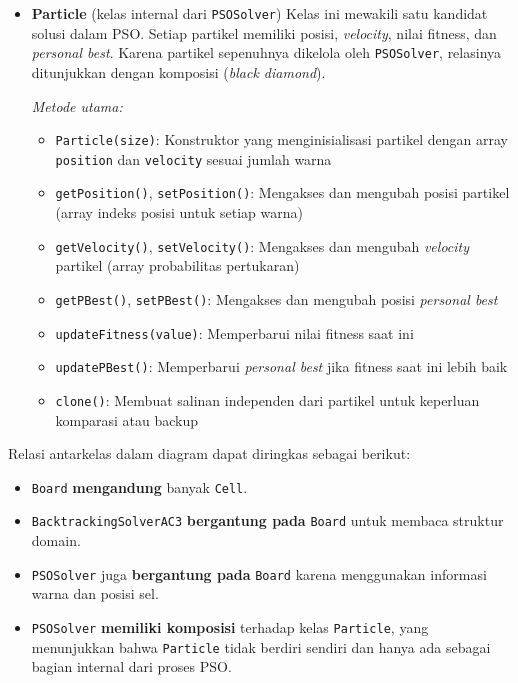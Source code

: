 \documentclass[a4paper,twoside]{article}
\begin{document}
\begin{itemize}
		\item \textbf{Particle} (kelas internal dari \texttt{PSOSolver})  
		Kelas ini mewakili satu kandidat solusi dalam PSO. Setiap partikel memiliki posisi, \textit{velocity}, nilai fitness, dan \textit{personal best}. Karena partikel sepenuhnya dikelola oleh \texttt{PSOSolver}, relasinya ditunjukkan dengan komposisi (\textit{black diamond}).
		
		\textit{Metode utama:}
		\begin{itemize}
			\item \texttt{Particle(size)}: Konstruktor yang menginisialisasi partikel dengan array \texttt{position} dan \texttt{velocity} sesuai jumlah warna
			\item \texttt{getPosition()}, \texttt{setPosition()}: Mengakses dan mengubah posisi partikel (array indeks posisi untuk setiap warna)
			\item \texttt{getVelocity()}, \texttt{setVelocity()}: Mengakses dan mengubah \textit{velocity} partikel (array probabilitas pertukaran)
			\item \texttt{getPBest()}, \texttt{setPBest()}: Mengakses dan mengubah posisi \textit{personal best}
			\item \texttt{updateFitness(value)}: Memperbarui nilai fitness saat ini
			\item \texttt{updatePBest()}: Memperbarui \textit{personal best} jika fitness saat ini lebih baik
			\item \texttt{clone()}: Membuat salinan independen dari partikel untuk keperluan komparasi atau backup
		\end{itemize}
		
	\end{itemize}
	
	Relasi antarkelas dalam diagram dapat diringkas sebagai berikut:
	\begin{itemize}
		\item \texttt{Board} \textbf{mengandung} banyak \texttt{Cell}.
		\item \texttt{BacktrackingSolverAC3} \textbf{bergantung pada} \texttt{Board} untuk membaca struktur domain.
		\item \texttt{PSOSolver} juga \textbf{bergantung pada} \texttt{Board} karena menggunakan informasi warna dan posisi sel.
		\item \texttt{PSOSolver} \textbf{memiliki komposisi} terhadap kelas \texttt{Particle}, yang menunjukkan bahwa \texttt{Particle} tidak berdiri sendiri dan hanya ada sebagai bagian internal dari proses PSO.
	\end{itemize}
	
\end{document}
